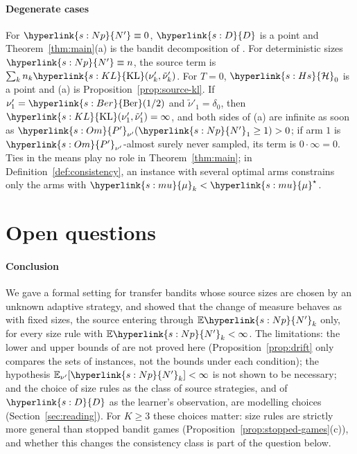 \documentclass[11pt]{article}
\newcommand{\sy}[2]{\hyperlink{#1}{#2}}
\newcommand{\E}{\mathbb{E}}
\newcommand{\KL}{\sy{s:KL}{\mathrm{KL}}}
\newcommand{\Hs}{\sy{s:Hs}{\mathcal{H}}}
\newcommand{\Ber}{\sy{s:Ber}{\mathrm{Ber}}}
\newcommand{\Np}{\sy{s:Np}{N'}}
\newcommand{\Dd}{\sy{s:D}{D}}
\newcommand{\mean}{\sy{s:mu}{\mu}}
\newcommand{\Pp}{\sy{s:Om}{P'}}
\begin{document}
\paragraph{Degenerate cases} For $\Np\equiv0$, $\Dd$ is a point and Theorem~\ref{thm:main}(a) is the
bandit decomposition of \citet[(8)]{GMS19}. For deterministic sizes $\Np\equiv n$, the source term is
$\sum_kn_k\KL(\nu'_k,\tilde\nu'_k)$. For $T=0$, $\Hs_0$ is a point and (a) is
Proposition~\ref{prop:source-kl}. If $\nu'_1=\Ber(1/2)$ and $\tilde\nu'_1=\delta_0$, then
$\KL(\nu'_1,\tilde\nu'_1)=\infty$, and both sides of (a) are infinite as soon as
$\Pp_{\nu'}(\Np_1\ge1)>0$; if arm $1$ is $\Pp_{\nu'}$-almost surely never sampled, its term is
$0\cdot\infty=0$. Ties in the means play no role in Theorem~\ref{thm:main}; in
Definition~\ref{def:consistency}, an instance with several optimal arms constrains only the arms
with $\mean_k<\mean^\star$.

\section{Open questions}\label{sec:open}

\paragraph{Conclusion}
We gave a formal setting for transfer bandits whose source sizes are chosen by an unknown adaptive
strategy, and showed that the change of measure behaves as with fixed sizes, the source entering
through $\E \Np_k$ only, for every size rule with $\E \Np_k<\infty$. The limitations: the lower and
upper bounds of \citet{PMRM26} are not proved here (Proposition~\ref{prop:drift} only compares the
sets of instances, not the bounds under each condition); the hypothesis $\E_{\nu'}[\Np_k]<\infty$ is
not shown to be necessary; and the choice of size rules as the class of source strategies, and of
$\Dd$ as the learner's observation, are modelling choices (Section~\ref{sec:reading}). For $K\ge3$
these choices matter: size rules are strictly more general than stopped bandit games
(Proposition~\ref{prop:stopped-games}(c)), and whether this changes the consistency class is part
of the question below.
\end{document}
